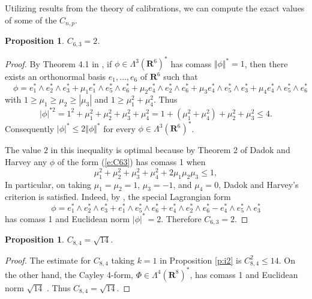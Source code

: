 \documentclass[12pt]{amsart}
\newtheorem{proposition}[theorem]{Proposition}
\theoremstyle{definition}
\theoremstyle{remark}
\numberwithin{equation}{section}
\begin{document}
Utilizing  results from the theory of calibrations, we can compute the exact values of some of the $C_{n,p}$.
\begin{proposition}%
{$C_{6,3} =2$.}
\end{proposition}
\begin{proof}
By Theorem 4.1 in \cite{FM}, if $\phi \in \Lambda^3(\mathbf{R}^6)^\ast$ has comass $\Vert\phi\Vert^\ast =1$,  then there exists an orthonormal basis $e_1, \dots, e_6$ of $\mathbf{R}^6$  such that
\begin{equation}\label{e:C63}
\quad \phi = e^\ast_1\wedge e^\ast_2 \wedge e^\ast_3+ \mu_1e^\ast_1\wedge e^\ast_5 \wedge e^\ast_6+ \mu_2e^\ast_4\wedge e^\ast_2 \wedge e^\ast_6+ \mu_3e^\ast_4\wedge e^\ast_5 \wedge e^\ast_3
+\mu_4e^\ast_4\wedge e^\ast_5 \wedge e^\ast_6
\end{equation}
with $ 1 \geq \mu_1 \geq \mu_2 \geq |\mu_3|$ and $1 \geq \mu_1^2 +\mu_4^2$. Thus
$$|\phi|^{*2} = 1^2 + \mu_1^2 +\mu_2^2 + \mu_3^2 +\mu_4^2 = 1 + (\mu_1^2 +\mu_4^2) +\mu_2^2 +\mu_3^2 \leq 4.$$
Consequently $|\phi|^* \leq 2 \Vert \phi \Vert^*$ for every $\phi \in \Lambda^3(\mathbf{R}^6)^\ast$.

The value $2$ in this inequality is optimal because by Theorem 2 of Dadok and Harvey\cite{DH}
any $\phi$ of the form (\ref{e:C63}) has comass 1 when 
$$ \mu_1^2 + \mu_2^2 + \mu_3^2 +\mu_4^2 + 2\mu_1\mu_2\mu_3 \leq 1,$$
In particular, on taking $\mu_1=\mu_2 =1$, $\mu_3= -1$, and $\mu_4=0$, Dadok and Harvey's criterion is satisfied. Indeed, by \cite[Theorem 5]{DH}, the special Lagrangian form 
$$\phi = e^\ast_1\wedge e^\ast_2 \wedge e^\ast_3+ e^\ast_1\wedge e^\ast_5 \wedge e^\ast_6+ e^\ast_4\wedge e^\ast_2 \wedge e^\ast_6- e^\ast_4\wedge e^\ast_5 \wedge e^\ast_3$$
has comass 1 and Euclidean norm $|\phi|^* =2$. Therefore $C_{6,3} =2$.
\end{proof}

\begin{proposition}{$C_{8,4} = \sqrt{14}$.}\end{proposition}%
\begin{proof}
The estimate for $C_{8,4}$ taking $k=1$ in Proposition \ref{p:i2} is $C_{8,4}^2 \leq 14$. On the other hand, the Cayley 4-form, $\Phi \in \Lambda^4(\mathbf{R}^8)^\ast$,  has comass 1 and Euclidean norm $\sqrt{14}$ \cite{RB, HL}. Thus $C_{8,4} = \sqrt{14}$.
\end{proof}
\end{document}

